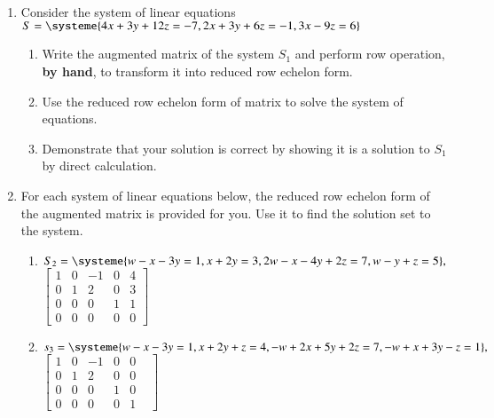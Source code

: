 \documentclass[minion]{homework}
\begin{document}
\begin{enumerate}
\item Consider the system of linear equations\: $S=\systeme{4x+3y+12z=-7,2x+3y+6z=-1,3x-9z=6}$ 
	\begin{enumerate}
	\item Write the augmented matrix of the system $S_1$ and perform row operation, \textbf{by hand}, to transform it into reduced row echelon form.
	\item Use the reduced row echelon form of matrix to solve the system of equations.
	\item Demonstrate that your solution is correct by showing it is a solution to $S_1$ by direct calculation.\\
	\end{enumerate}
\item For each system of linear equations below, the reduced row echelon form of the augmented matrix is provided for you. Use it to find the solution set to the system.
	\begin{enumerate}
	\item $S_2=\systeme{w-x-3y=1,x+2y=3,2w-x-4y+2z=7,w-y+z=5},$ \hspace{.3in} $\begin{bmatrix} 1&0&-1&0&4\\ 0&1&2&0&3 \\ 0&0&0&1&1\\0&0&0&0&0\end{bmatrix}$\\

\vspace{.2in}
	
	\item $s_3=\systeme{w-x-3y=1,x+2y+z=4,-w+2x+5y+2z=7,-w+x+3y-z=1},$ \hspace{.3in} $\begin{bmatrix} 1&0&-1&0&0\\0&1&2&0&0&\\0&0&0&1&0\\0&0&0&0&1 \end{bmatrix}$
	\end{enumerate}
\end{enumerate}
\end{document}

